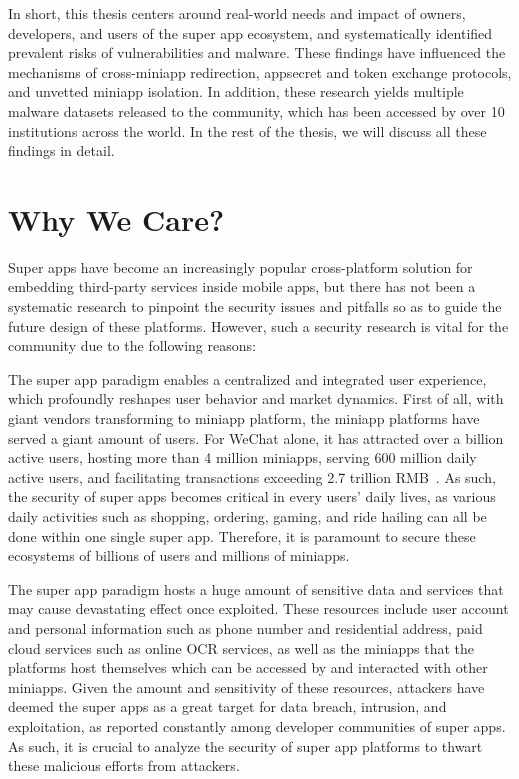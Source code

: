 \documentclass{osudissert96}
\renewcommand{\paragraph}[1]{\vspace{0.05in}\noindent{\bf{#1}.}}
\begin{document}
In short, this thesis centers around real-world needs and impact of owners, developers, and users of the super app ecosystem, and systematically identified prevalent risks of vulnerabilities and malware. These findings have influenced the mechanisms of cross-miniapp redirection, appsecret and token exchange protocols, and unvetted miniapp isolation. In addition, these research yields multiple malware datasets released to the community, which has been accessed by over 10 institutions across the world. In the rest of the thesis, we will discuss all these findings in detail. 

\section{Why We Care?}
Super apps have become an increasingly popular cross-platform solution for embedding third-party services inside mobile apps, but there has not been a systematic research to pinpoint the security issues and pitfalls so as to guide the future design of these platforms. However, such a security research is vital for the community due to the following reasons:

\paragraph{Significant impact} The super app paradigm enables a centralized and integrated user experience, which profoundly reshapes user behavior and market dynamics. First of all, with giant vendors transforming to miniapp platform, the miniapp platforms have served a giant amount of users. For WeChat alone, it has attracted over a billion active users, hosting more than 4 million miniapps, serving 600 million daily active users, and facilitating transactions exceeding 2.7 trillion RMB~\cite{wechatreport2023}. As such, the security of super apps becomes critical in every users' daily lives, as various daily activities such as shopping, ordering, gaming, and ride hailing can all be done within one single super app. Therefore, it is paramount to secure these ecosystems of billions of users and millions of miniapps.

\paragraph{Sensitive resources} The super app paradigm hosts a huge amount of sensitive data and services that may cause devastating effect once exploited. These resources include user account and personal information such as phone number and residential address, paid cloud services such as online OCR services, as well as the miniapps that the platforms host themselves which can be accessed by and interacted with other miniapps. Given the amount and sensitivity of these resources, attackers have deemed the super apps as a great target for data breach, intrusion, and exploitation, as reported constantly among developer communities of super apps. As such, it is crucial to analyze the security of super app platforms to thwart these malicious efforts from attackers.
\end{document}
